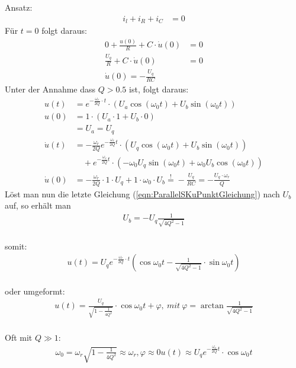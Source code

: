 Ansatz:
\begin{align*}
i_l + i_R + i_C &= 0
\end{align*}
Für $t=0$ folgt daraus:
\begin{align}
0 + \frac{u(0)}{R} + C \cdot \dot{u}(0) &= 0 \nonumber \\
\frac{U_q}{R} + C \cdot \dot{u}(0) &= 0 \nonumber \\
\boxed{\dot{u}(0) = -\frac{U_q}{RC}}
\end{align}
Unter der Annahme dass $Q > 0.5$ ist, folgt daraus:
\begin{align}
u(t) &= e^{-\frac{\omega_r}{2Q}\cdot t} \cdot \left(U_a \cos(\omega_0 t) + U_b
\sin(\omega_0 t) \right) \nonumber \\
u(0) &= 1 \cdot \left(U_a \cdot 1 + U_b \cdot 0 \right) \nonumber \\
&\boxed{= U_a = U_q} \\
\dot{u}(t) &= -\frac{\omega_r}{2Q} e^{-\frac{\omega_r}{2Q}t} \cdot \left(
U_q \cos(\omega_0 t) + U_b \sin(\omega_0 t)\right) \nonumber \\
&\quad + e^{-\frac{\omega_r}{2Q}t} \cdot \left( -\omega_0 U_q
\sin(\omega_0 t) + \omega_0 U_b \cos(\omega_0 t)\right) \nonumber \\
\dot{u}(0) &= -\frac{\omega_r}{2Q} \cdot 1 \cdot U_q + 1 \cdot \omega_0 \cdot
U_b \overset{!}{=} -\frac{U_q}{RC} =
-\frac{U_q \cdot \omega_r}{Q}\label{eqn:ParallelSKuPunktGleichung}
\end{align}
Löst man nun die letzte Gleichung (\ref{eqn:ParallelSKuPunktGleichung}) nach
$U_b$ auf, so erhält man
\begin{align}
\boxed{U_b = -U_q \frac{1}{\sqrt{4Q^2-1}}}
\end{align}\\
somit:
\begin{align}
\boxed{
u(t)=U_q e^{-\frac{\omega_r}{2Q}\cdot
t}(\cos{\omega_0t}-\frac{1}{\sqrt{4Q^2-1}}\cdot \sin{\omega_0t})}
\end{align} \\
oder umgeformt:
\begin{align}
u(t)=\frac{U_q}{\sqrt{1-\frac{1}{4Q^2}}}\cdot
\cos{\omega_0t+\varphi},\ mit\ \varphi=\arctan{\frac{1}{\sqrt{4Q^2-1}}}\nonumber
\end{align}\\
Oft mit $Q\gg 1$:
\begin{align}
	\omega_0 = \omega_r\sqrt{1-\frac{1}{4Q^2}}\approx\omega_r, \varphi\approx 0
	u(t)\approx U_q e^{-\frac{\omega_r}{2Q}t}\cdot\cos{\omega_0t}\nonumber
\end{align}\\
